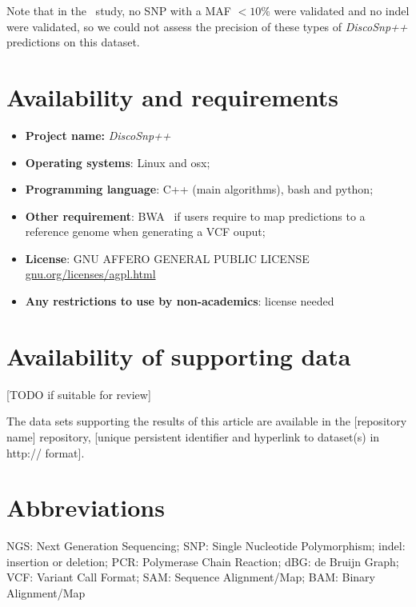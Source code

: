 \documentclass{bmcart}
\newcommand{\discopp}{{\it DiscoSnp++}\xspace}
\begin{document}

Note that in the~\cite{Kvitek2013} study, no SNP with a MAF $<10\%$ were validated and no indel were validated, so we could not assess the precision of these types of \discopp predictions on this dataset.



\section*{Availability and requirements}
\begin{itemize}
	\item \textbf{Project name:} \discopp
	\item \textbf{Operating systems}: Linux and osx;
	\item \textbf{Programming language}: C++ (main algorithms), bash and python;
	\item \textbf{Other requirement}: BWA~\cite{bwa} if users require to map predictions to a reference genome when generating a VCF ouput;
	\item \textbf{License}: GNU AFFERO GENERAL PUBLIC LICENSE \url{gnu.org/licenses/agpl.html}
	\item \textbf{Any restrictions to use by non-academics}: license needed
\end{itemize}


\section*{Availability of supporting data}
[TODO if suitable for review]

The data sets supporting the results of this article are available in the [repository name] repository, [unique persistent identifier and hyperlink to dataset(s) in http:// format].


\section*{Abbreviations}
NGS: Next Generation Sequencing; SNP: Single Nucleotide Polymorphism; indel: insertion or deletion; PCR: Polymerase Chain Reaction; dBG: de Bruijn Graph; VCF: Variant Call Format; SAM: Sequence Alignment/Map; BAM: Binary Alignment/Map
\end{document}
